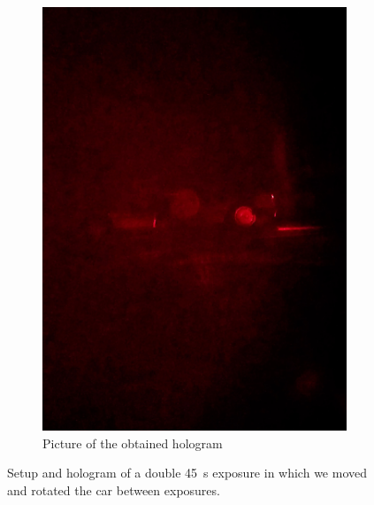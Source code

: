 \documentclass[11pt,a4paper]{article}
\begin{document}
\begin{figure}[ht]
\begin{subfigure}[b]{0.35\textwidth}
\includegraphics[width=\textwidth]{car_double_exposure_hologram}
\caption{Picture of the obtained hologram}
\label{fig:result}
\end{subfigure}
\caption{Setup and hologram of a double \SI{45}{\second} exposure in which we moved and rotated the car between exposures.}
\label{fig:experiment_double_exposure}
\end{figure}

\vfill
\nocite{*}


\end{document}
